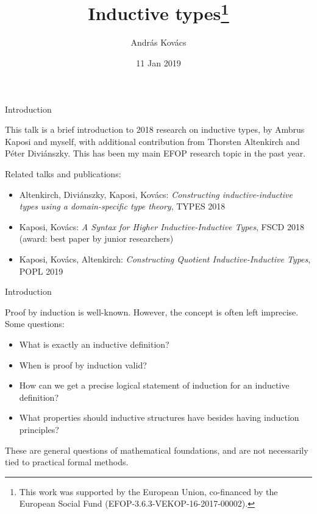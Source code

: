 \documentclass[dvipsnames]{beamer}
\title{Inductive types\thanks{This work was supported by the European Union, co-financed by the European
    Social Fund (EFOP-3.6.3-VEKOP-16-2017-00002).}}
\author{András Kovács}
\institute{Eötvös Loránd University, Department of Programming Languages and Compilers}
\date{11 Jan 2019}
\begin{document}
\frame{\titlepage}

\begin{frame}{Introduction}

This talk is a brief introduction to 2018 research on inductive types, by Ambrus
Kaposi and myself, with additional contribution from Thorsten Altenkirch and
Péter Diviánszky. This has been my main EFOP research topic in the past year.
\vspace{1em}

Related talks and publications:

\begin{itemize}
\item Altenkirch, Diviánszky, Kaposi, Kovács: \emph{Constructing inductive-inductive types using a domain-specific type theory}, TYPES 2018
\item Kaposi, Kovács: \emph{A Syntax for Higher
  Inductive-Inductive Types}, FSCD 2018 (award: best paper by junior researchers)
\item Kaposi, Kovács, Altenkirch: \emph{Constructing Quotient Inductive-Inductive Types}, POPL 2019
\end{itemize}

\end{frame}


\begin{frame}{Introduction}

  Proof by induction is well-known. However, the concept is often left imprecise.
  Some questions:

  \begin{itemize}
  \item What is exactly an inductive definition?
  \item When is proof by induction valid?
  \item How can we get a precise logical statement of induction for an inductive definition?
  \item What properties should inductive structures have besides having induction principles?
  \end{itemize}

\vspace{1em}
\pause

These are general questions of mathematical foundations, and are not necessarily tied to practical
formal methods.


\end{frame}
\end{document}
